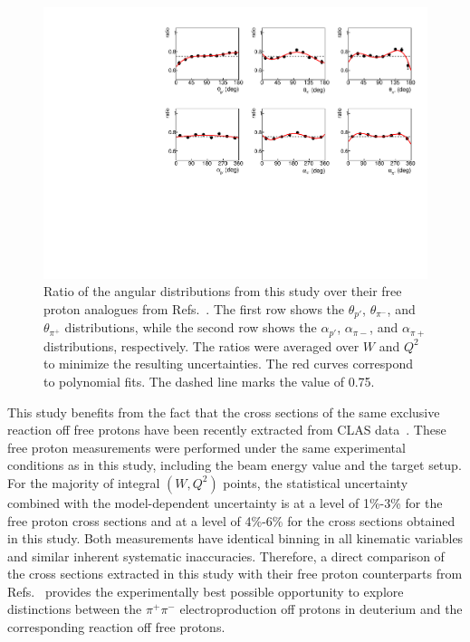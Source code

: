 \documentclass[prc,twocolumn,superscriptaddress,showpacs,amssymb,amsmath,amsfonts,aps,nofootinbib]{revtex4-1}
\begin{document}
\begin{figure}[htp]
\begin{center}
\includegraphics[width=12cm]{pictures/fed_comp/angles2.pdf}
\caption{\small Ratio of the angular distributions from this study over their free proton analogues from Refs.\!~\cite{Fed_an_note:2017,Fed_paper_2018}. The first row shows the $\theta_{p'}$, $\theta_{\pi^{-}}$, and $\theta_{\pi^{+}}$ distributions, while the second row shows the $\alpha_{p'}$, $\alpha_{\pi{-}}$, and $\alpha_{\pi{+}}$ distributions, respectively. The ratios were averaged over $W$ and $Q^{2}$ to minimize the resulting uncertainties. The red curves correspond to polynomial fits. The dashed line marks the value of 0.75.} \label{fig:fed_ang}
\end{center}
\end{figure}



This study benefits from the fact that the cross sections of the same exclusive reaction off free protons have been recently extracted from CLAS data~\cite{Fed_an_note:2017,Fed_paper_2018}. These free proton measurements were performed under the same experimental conditions as in this study, including the beam energy value and the target setup. For the majority of integral $(W,Q^{2})$ points, the statistical uncertainty combined with the model-dependent uncertainty is at a level of 1\%-3\% for the free proton cross sections and at a level of 4\%-6\% for the cross sections obtained in this study. Both measurements have identical binning in all kinematic variables and similar inherent systematic inaccuracies. Therefore, a direct comparison of the cross sections extracted in this study with their free proton counterparts from Refs.\!~\cite{Fed_an_note:2017,Fed_paper_2018} provides the experimentally best possible opportunity to explore distinctions between the $\pi^{+}\pi^{-}$ electroproduction off protons in deuterium and the corresponding reaction off free protons.
\end{document}
